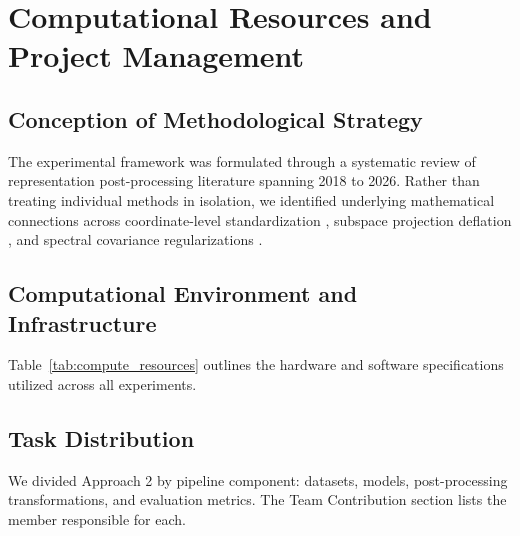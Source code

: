 
\section{Computational Resources and Project Management}
\label{sec:resources_management}

\subsection{Conception of Methodological Strategy}
The experimental framework was formulated through a systematic review of representation post-processing literature spanning 2018 to 2026. Rather than treating individual methods in isolation, we identified underlying mathematical connections across coordinate-level standardization \citep{timkey2021all}, subspace projection deflation \citep{mu2018all,ren2025correcting}, and spectral covariance regularizations \citep{su2021whitening,diera2024isotropy,li2026spectral}.

\subsection{Computational Environment and Infrastructure}
Table~\ref{tab:compute_resources} outlines the hardware and software specifications utilized across all experiments.

\begin{table}[!htbp]
\centering
\small
{}
\caption{Summary of computational resources and environment specifications.}
\label{tab:compute_resources}
\end{table}

\subsection{Task Distribution}
We divided Approach 2 by pipeline component: datasets, models, post-processing transformations, and evaluation metrics. The Team Contribution section lists the member responsible for each.
